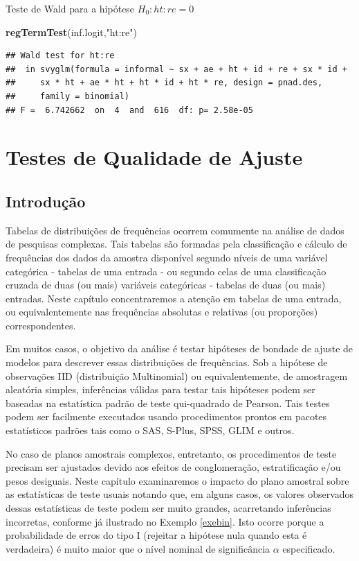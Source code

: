 \documentclass[]{book}
\newenvironment{Shaded}{\begin{snugshade}}{\end{snugshade}}
\newcommand{\KeywordTok}[1]{\textcolor[rgb]{0.13,0.29,0.53}{\textbf{{#1}}}}
\newcommand{\StringTok}[1]{\textcolor[rgb]{0.31,0.60,0.02}{{#1}}}
\newcommand{\NormalTok}[1]{{#1}}
\numberwithin{example}{chapter}
\numberwithin{remark}{chapter}
\numberwithin{definition}{chapter}
\begin{document}
Teste de Wald para a hipótese \(H_0: ht:re=0\)

\begin{Shaded}
\begin{Highlighting}[]
\KeywordTok{regTermTest}\NormalTok{(inf.logit,}\StringTok{"ht:re"}\NormalTok{)}
\end{Highlighting}
\end{Shaded}

\begin{verbatim}
## Wald test for ht:re
##  in svyglm(formula = informal ~ sx + ae + ht + id + re + sx * id + 
##     sx * ht + ae * ht + ht * id + ht * re, design = pnad.des, 
##     family = binomial)
## F =  6.742662  on  4  and  616  df: p= 2.58e-05
\end{verbatim}

\chapter{Testes de Qualidade de Ajuste}\label{testqualajust}

\section{Introdução}\label{introducao-1}

Tabelas de distribuições de frequências ocorrem comumente na análise de
dados de pesquisas complexas. Tais tabelas são formadas pela
classificação e cálculo de frequências dos dados da amostra disponível
segundo níveis de uma variável categórica - tabelas de uma entrada - ou
segundo celas de uma classificação cruzada de duas (ou mais) variáveis
categóricas - tabelas de duas (ou mais) entradas. Neste capítulo
concentraremos a atenção em tabelas de uma entrada, ou equivalentemente
nas frequências absolutas e relativas (ou proporções) correspondentes.

Em muitos casos, o objetivo da análise é testar hipóteses de bondade de
ajuste de modelos para descrever essas distribuições de frequências. Sob
a hipótese de observações IID (distribuição Multinomial) ou
equivalentemente, de amostragem aleatória simples, inferências válidas
para testar tais hipóteses podem ser baseadas na estatística padrão de
teste qui-quadrado de Pearson. Tais testes podem ser facilmente
executados usando procedimentos prontos em pacotes estatísticos padrões
tais como o SAS, S-Plus, SPSS, GLIM e outros.

No caso de planos amostrais complexos, entretanto, os procedimentos de
teste precisam ser ajustados devido aos efeitos de conglomeração,
estratificação e/ou pesos desiguais. Neste capítulo examinaremos o
impacto do plano amostral sobre as estatísticas de teste usuais notando
que, em alguns casos, os valores observados dessas estatísticas de teste
podem ser muito grandes, acarretando inferências incorretas, conforme já
ilustrado no Exemplo \ref{exebin}. Isto ocorre porque a probabilidade de
erros do tipo I (rejeitar a hipótese nula quando esta é verdadeira) é
muito maior que o nível nominal de significância \(\alpha\)
especificado.
\end{document}
